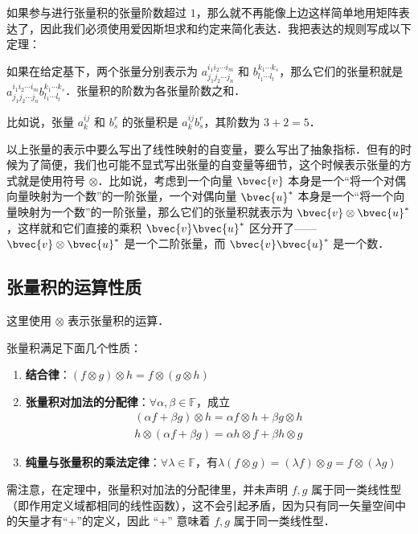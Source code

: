 如果参与进行张量积的张量阶数超过 $1$，那么就不再能像上边这样简单地用矩阵表达了，因此我们必须使用爱因斯坦求和约定来简化表达．我把表达的规则写成以下定理：

\begin{theorem}{}
如果在给定基下，两个张量分别表示为 $a^{i_1i_2\cdots i_m}_{j_1j_2\cdots j_n}$ 和 $b^{k_1\cdots k_s}_{l_1\cdots l_t}$，那么它们的张量积就是 $a^{i_1i_2\cdots i_m}_{j_1j_2\cdots j_n}b^{k_1\cdots k_s}_{l_1\cdots l_t}$．张量积的阶数为各张量阶数之和．
\end{theorem}

比如说，张量 $a^{ij}_k$ 和 $b^r_s$ 的张量积是 $a^{ij}_kb^r_s$，其阶数为 $3+2=5$．

以上张量的表示中要么写出了线性映射的自变量，要么写出了抽象指标．但有的时候为了简便，我们也可能不显式写出张量的自变量等细节，这个时候表示张量的方式就是使用符号 $\otimes$．比如说，考虑到一个向量 $\bvec{v}$ 本身是一个“将一个对偶向量映射为一个数”的一阶张量，一个对偶向量 $\bvec{u}^*$ 本身是一个“将一个向量映射为一个数”的一阶张量，那么它们的张量积就表示为 $\bvec{v}\otimes\bvec{u}^*$，这样就和它们直接的乘积 $\bvec{v}\bvec{u}^*$ 区分开了——$\bvec{v}\otimes\bvec{u}^*$ 是一个二阶张量，而 $\bvec{v}\bvec{u}^*$ 是一个数．

\subsection{张量积的运算性质}
这里使用 $\otimes$ 表示张量积的运算．
\begin{theorem}{}\label{TsrPrd_the1}
张量积满足下面几个性质：
\begin{enumerate}
\item \textbf{结合律}：$(f\otimes g)\otimes h=f\otimes (g\otimes h)$
\item \textbf{张量积对加法的分配律}：$\forall \alpha,\beta\in\mathbb F$，成立
\begin{equation}
\begin{aligned}
(\alpha f+\beta g)\otimes h=\alpha f\otimes h+\beta g\otimes h\\
h\otimes(\alpha f+\beta g)=\alpha h\otimes f+\beta h\otimes g
\end{aligned}
\end{equation}
\item \textbf{纯量与张量积的乘法定律}：$\forall \lambda\in\mathbb F$，有$\lambda (f\otimes g)=(\lambda f)\otimes g=f\otimes (\lambda g)$
\end{enumerate}
\end{theorem}
需注意，在定理中，张量积对加法的分配律里，并未声明 $f,g$ 属于同一类线性型（即作用定义域都相同的线性函数），这不会引起矛盾，因为只有同一矢量空间中的矢量才有“+”的定义，因此 “+” 意味着 $f,g$ 属于同一类线性型．

